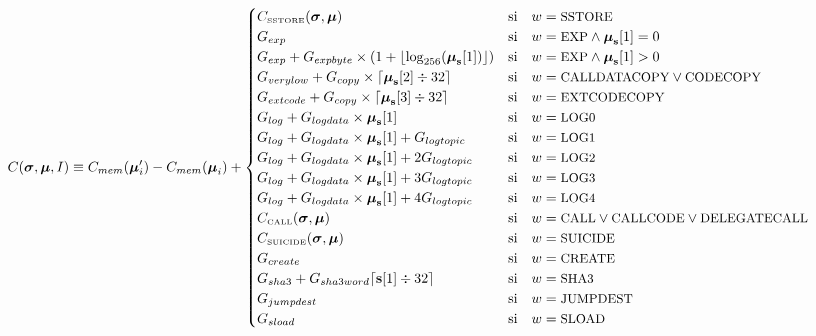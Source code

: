 \documentclass[9pt,oneside]{amsart}
\begin{document}
\begin{equation}
C(\boldsymbol{\sigma}, \boldsymbol{\mu}, I) \equiv C_{mem}(\boldsymbol{\mu}'_i)-C_{mem}(\boldsymbol{\mu}_i) + \begin{cases}
C_\text{\tiny SSTORE}(\boldsymbol{\sigma}, \boldsymbol{\mu}) & \text{si} \quad w = \text{\small SSTORE} \\
G_{exp} & \text{si} \quad w = \text{\small EXP} \wedge \boldsymbol{\mu}_\mathbf{s}[1] = 0 \\
G_{exp} + G_{expbyte}\times(1+\lfloor\log_{256}(\boldsymbol{\mu}_\mathbf{s}[1])\rfloor) & \text{si} \quad w = \text{\small EXP} \wedge \boldsymbol{\mu}_\mathbf{s}[1] > 0 \\
G_{verylow} + G_{copy}\times\lceil\boldsymbol{\mu}_\mathbf{s}[2] \div 32\rceil & \text{si} \quad w = \text{\small CALLDATACOPY} \lor \text{\small CODECOPY} \\
G_{extcode} + G_{copy}\times\lceil\boldsymbol{\mu}_\mathbf{s}[3] \div 32\rceil & \text{si} \quad w = \text{\small EXTCODECOPY} \\
G_{log}+G_{logdata}\times\boldsymbol{\mu}_\mathbf{s}[1] & \text{si} \quad w = \text{\small LOG0} \\
G_{log}+G_{logdata}\times\boldsymbol{\mu}_\mathbf{s}[1]+G_{logtopic} & \text{si} \quad w = \text{\small LOG1} \\
G_{log}+G_{logdata}\times\boldsymbol{\mu}_\mathbf{s}[1]+2G_{logtopic} & \text{si} \quad w = \text{\small LOG2} \\
G_{log}+G_{logdata}\times\boldsymbol{\mu}_\mathbf{s}[1]+3G_{logtopic} & \text{si} \quad w = \text{\small LOG3} \\
G_{log}+G_{logdata}\times\boldsymbol{\mu}_\mathbf{s}[1]+4G_{logtopic} & \text{si} \quad w = \text{\small LOG4} \\
C_\text{\tiny CALL}(\boldsymbol{\sigma}, \boldsymbol{\mu}) & \text{si} \quad w = \text{\small CALL} \lor \text{\small CALLCODE} \lor \text{\small DELEGATECALL} \\
C_\text{\tiny SUICIDE}(\boldsymbol{\sigma}, \boldsymbol{\mu}) & \text{si} \quad w = \text{\small SUICIDE} \\
G_{create} & \text{si} \quad w = \text{\small CREATE}\\
G_{sha3}+G_{sha3word} \lceil \mathbf{s}[1] \div 32 \rceil & \text{si} \quad w = \text{\small SHA3}\\
G_{jumpdest} & \text{si} \quad w = \text{\small JUMPDEST}\\
G_{sload} & \text{si} \quad w = \text{\small SLOAD}\\

\end{cases}
\end{equation}
\end{document}
